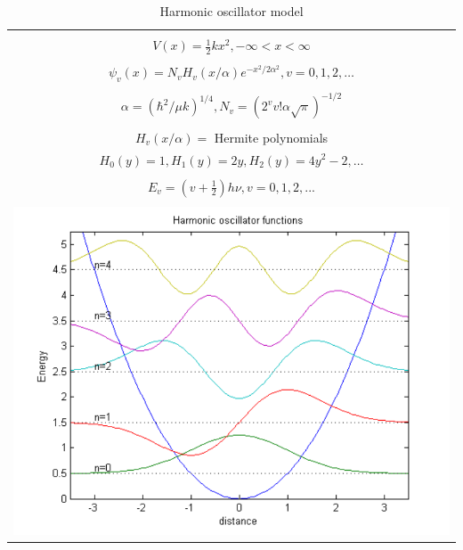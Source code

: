 \message{ !name(Outline.tex)}\documentclass[11pt]{article}
\begin{document}
\begin{outline}
\begin{table}[tbh]
   \begin{center}
   \caption{Harmonic oscillator model}
    \label{Harmonic-oscillator}
\begin{tabular}[h]{|c|}
\hline
 \\
$\displaystyle       V(x) = \frac{1}{2} k x^2, -\infty < x < \infty $ \\
 \\
$\displaystyle     \psi_v(x) = N_v H_v(x/\alpha)e^{-x^2/2\alpha^2}, v = 0, 1, 2, \ldots $ \\
\\
$\displaystyle \alpha=(\hbar^2/\mu k)^{1/4}, N_v=(2^vv!\alpha\sqrt{\pi})^{-1/2} $ \\
 \\
$\displaystyle  H_v(x/\alpha)=$ Hermite polynomials \\
$\displaystyle H_0(y) =1, H_1(y) = 2y, H_2(y) = 4y^2-2, \ldots $ \\ 
 \\
$\displaystyle     E_v=(v+\frac{1}{2})h \nu, v=0, 1, 2, ...$ \\
 \\
     \includegraphics[scale=.6]{Images/HO} \\       
\hline
\end{tabular}
 \end{center}
\end{table}


\end{outline}
\end{document}
